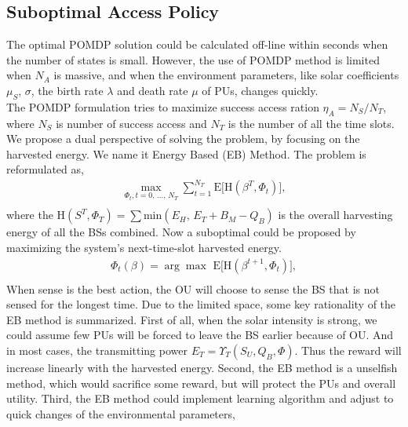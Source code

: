 \documentclass[conference]{IEEEtran}
\begin{document}
\subsection{Suboptimal Access Policy}
The optimal POMDP solution could be calculated off-line within seconds when the number of states is small.
However, the use of POMDP method is limited when \(N_A\) is massive,
and when the environment parameters, like solar coefficients \(\mu_S\), \(\sigma\),
the birth rate \(\lambda\) and death rate \(\mu\) of PUs, changes quickly.\\
The POMDP formulation tries to maximize success access ration \(\eta_A = N_S/N_T\),
where \(N_S\) is number of success access and \(N_T\) is the number of all the time slots.
We propose a dual perspective of solving the problem, by focusing on the harvested energy.
We name it Energy Based (EB) Method.
The problem is reformulated as,
\begin{equation}
\begin{aligned}
	\underset{\Phi_t,t=0,\,...,\,N_T}{\max}\sum\nolimits_{t=1}^{N_T}\mbox{E}\lbrack\mbox{H}\left(\beta^T, \Phi_t\right)\rbrack,\\
\end{aligned}
\end{equation}
where the \(\mbox{H}\left(S^T, \Phi_T\right) = \sum\mbox{min}\left(E_H,\,E_T+B_M-Q_B\right)\)
is the overall harvesting energy of all the BSs combined.
Now a suboptimal could be proposed by maximizing the system's next-time-slot harvested energy.
\begin{equation}
\begin{aligned}
	\Phi_t\left(\beta\right) = \arg{\max}\,\,\mbox{E}\lbrack\mbox{H}(\beta^{t+1}, \Phi_t)\rbrack,\\
\end{aligned}
\end{equation}
When sense is the best action, the OU will choose to sense the BS that is not sensed for the longest time.
Due to the limited space, some key rationality of the EB method is summarized.
First of all, when the solar intensity is strong,
we could assume few PUs will be forced to leave the BS earlier because of OU.
And in most cases, the transmitting power \(E_T = \Upsilon_T(S_U, Q_B, \Phi)\).
Thus the reward will increase linearly with the harvested energy.
Second, the EB method is a unselfish method, which would sacrifice some reward,
but will protect the PUs and overall utility.
Third, the EB method could implement learning algorithm and adjust to quick changes of the environmental parameters,
\end{document}
